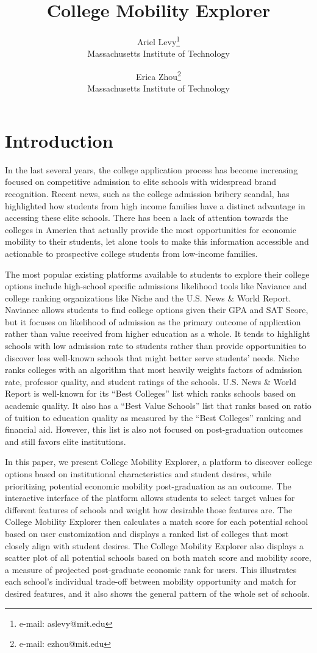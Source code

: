\documentclass{vgtc}
\title{College Mobility Explorer}
\author{Ariel Levy\thanks{e-mail: aslevy@mit.edu}\\ %
        \scriptsize Massachusetts Institute of Technology %
\and Erica Zhou\thanks{e-mail: ezhou@mit.edu}\\ %
     \scriptsize Massachusetts Institute of Technology}
\begin{document}
\maketitle

\section{Introduction}
In the last several years, the college application process has become increasing focused on competitive admission to elite schools with widespread brand recognition. Recent news, such as the college admission bribery scandal, has highlighted how students from high income families have a distinct advantage in accessing these elite schools. There has been a lack of attention towards the colleges in America that actually provide the most opportunities for economic mobility to their students, let alone tools to make this information accessible and actionable to prospective college students from low-income families. 

The most popular existing platforms available to students to explore their college options include high-school specific admissions likelihood tools like Naviance and college ranking organizations like Niche and the U.S. News \& World Report. Naviance allows students to find college options given their GPA and SAT Score, but it focuses on likelihood of admission as the primary outcome of application rather than value received from higher education as a whole. It tends to highlight schools with low admission rate to students rather than provide opportunities to discover less well-known schools that might better serve students’ needs. Niche ranks colleges with an algorithm that most heavily weights factors of admission rate, professor quality, and student ratings of the schools. U.S. News \& World Report is well-known for its ``Best Colleges'' list which ranks schools based on academic quality. It also has a ``Best Value Schools'' list that ranks based on ratio of tuition to education quality as measured by the ``Best Colleges'' ranking and financial aid. However, this list is also not focused on post-graduation outcomes and still favors elite institutions.

In this paper, we present College Mobility Explorer, a platform to discover college options based on institutional characteristics and student desires, while prioritizing potential economic mobility post-graduation as an outcome. The interactive interface of the platform allows students to select target values for different features of schools and weight how desirable those features are. The College Mobility Explorer then calculates a match score for each potential school based on user customization and displays a ranked list of colleges that most closely align with student desires. The College Mobility Explorer also displays a scatter plot of all potential schools based on both match score and mobility score, a measure of projected post-graduate economic rank for users. This illustrates each school’s individual trade-off between mobility opportunity and match for desired features, and it also shows the general pattern of the whole set of schools.
\end{document}
